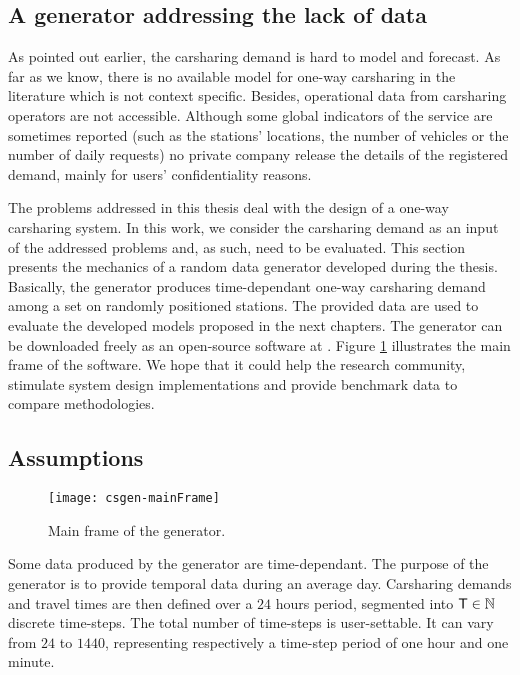 \begin{bibunit}[ieeetr]
\newpage
\section{A generator addressing the lack of data}

As pointed out earlier, the carsharing demand is hard to model and forecast.
As far as we know, there is no available model for one-way carsharing in the literature which is not context specific.
Besides, operational data from carsharing operators are not accessible.
Although some global indicators of the service are sometimes reported (such as the stations' locations, the number of vehicles or the number of daily requests) no private company release the details of the registered demand, mainly for users' confidentiality reasons.

\medskip
The problems addressed in this thesis deal with the design of a one-way carsharing system.
In this work, we consider the carsharing demand as an input of the addressed problems and, as such, need to be evaluated.
This section presents the mechanics of a random data generator developed during the thesis.
Basically, the generator produces time-dependant one-way carsharing demand among a set on randomly positioned stations.
The provided data are used to evaluate the developed models proposed in the next chapters.
The generator can be downloaded freely as an open-source software at \cite{csgen}.
Figure \ref{fig:csgen-mainFrame} illustrates the main frame of the software.
We hope that it could help the research community, stimulate system design implementations and provide benchmark data to compare methodologies.


\subsection{Assumptions}

\begin{figure}[!h]
\centering
\texttt{[image: csgen-mainFrame]}
\caption{Main frame of the generator.}
\label{fig:csgen-mainFrame}
\end{figure}

Some data produced by the generator are time-dependant.
The purpose of the generator is to provide temporal data during an average day.
Carsharing demands and travel times are then defined over a $24$ hours period, segmented into $\mathsf{T} \in \mathbb{N}$ discrete time-steps.
The total number of time-steps is user-settable.
It can vary from $24$ to $1440$, representing respectively a time-step period of one hour and one minute.


\end{bibunit}
